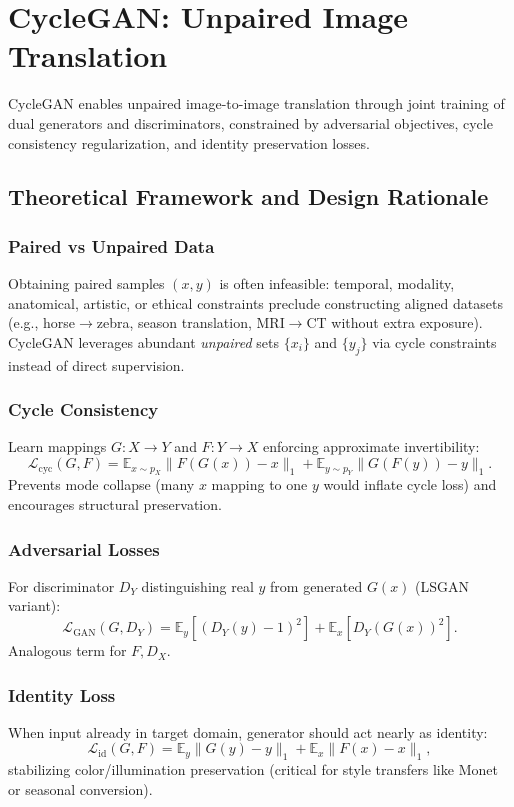 \documentclass[conference]{IEEEtran}
\begin{document}
\section{CycleGAN: Unpaired Image Translation}
CycleGAN enables unpaired image-to-image translation through joint training of dual generators and discriminators, constrained by adversarial objectives, cycle consistency regularization, and identity preservation losses.

\subsection{Theoretical Framework and Design Rationale}
\subsubsection{Paired vs Unpaired Data} Obtaining paired samples $(x,y)$ is often infeasible: temporal, modality, anatomical, artistic, or ethical constraints preclude constructing aligned datasets (e.g., horse$\to$zebra, season translation, MRI$\to$CT without extra exposure). CycleGAN leverages abundant \emph{unpaired} sets $\{x_i\}$ and $\{y_j\}$ via cycle constraints instead of direct supervision.

\subsubsection{Cycle Consistency} Learn mappings $G:X\to Y$ and $F:Y\to X$ enforcing approximate invertibility:
\begin{equation}
 \mathcal{L}_{\text{cyc}}(G,F) = \mathbb{E}_{x\sim p_X} \|F(G(x)) - x\|_1 + \mathbb{E}_{y\sim p_Y} \|G(F(y)) - y\|_1.
\end{equation}
Prevents mode collapse (many $x$ mapping to one $y$ would inflate cycle loss) and encourages structural preservation.

\subsubsection{Adversarial Losses} For discriminator $D_Y$ distinguishing real $y$ from generated $G(x)$ (LSGAN variant):
\begin{equation}
 \mathcal{L}_{\text{GAN}}(G,D_Y) = \mathbb{E}_{y}[ (D_Y(y)-1)^2 ] + \mathbb{E}_{x}[ D_Y(G(x))^2 ].
\end{equation}
Analogous term for $F,D_X$.

\subsubsection{Identity Loss} When input already in target domain, generator should act nearly as identity:
\begin{equation}
 \mathcal{L}_{\text{id}}(G,F) = \mathbb{E}_{y}\|G(y)-y\|_1 + \mathbb{E}_{x}\|F(x)-x\|_1,
\end{equation}
stabilizing color/illumination preservation (critical for style transfers like Monet or seasonal conversion).
\end{document}

